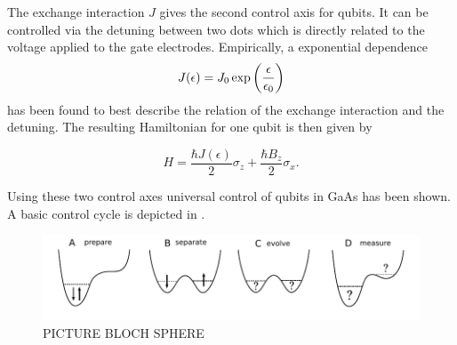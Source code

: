 The exchange interaction $J$ gives the second control axis for \sts qubits. It can be controlled via the detuning between two dots which is directly related to the voltage applied to the gate electrodes. Empirically, a exponential dependence
\begin{equation}
    J(\epsilon)=J_0 \exp \left( \frac{\epsilon}{\epsilon_0} \right)
\end{equation}
has been found to best describe the relation of the exchange interaction and the detuning. The resulting Hamiltonian for one qubit is then given by 

\begin{equation}
    H=\frac{\hbar J(\epsilon)}{2}\sigma_z + \frac{\hbar B_z}{2} \sigma_x.
\end{equation}

Using these two control axes universal control of \sts qubits in GaAs has been shown. A basic control cycle is depicted in . 

\begin{figure}[htbp]\centering
     \centering
     \includegraphics[width=1\textwidth]{./pictures/computationalcycle}
     \caption{PICTURE BLOCH SPHERE}
     \label{fig:controlcycle}
 \end{figure}

\begin{figure}[htbp] 
  \centering
   
  \caption{}
  \label{fig:cable}
\end{figure}


